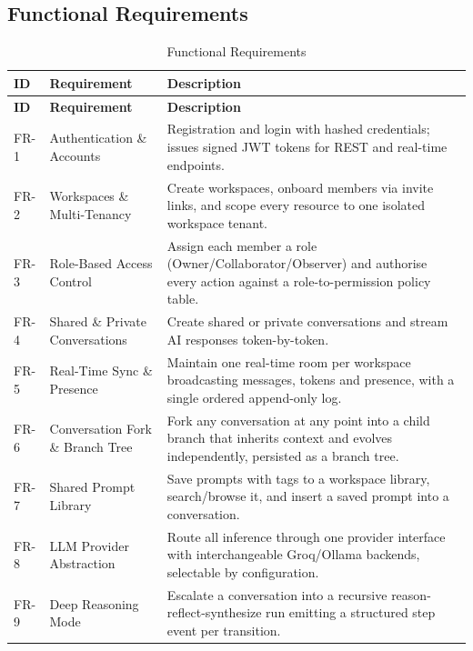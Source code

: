 \documentclass[12pt,a4paper]{report}
\begin{document}
\subsection{Functional Requirements}
\begingroup
\setlength{\parskip}{0pt}\renewcommand{\arraystretch}{1.32}\footnotesize
\begin{xltabular}{\textwidth}{>{\hsize\raggedright\arraybackslash}X >{\hsize\raggedright\arraybackslash}X >{\hsize\raggedright\arraybackslash}X}
\caption{Functional Requirements}\\
\toprule
\textbf{ID} & \textbf{Requirement} & \textbf{Description} \\
\midrule\endfirsthead
\toprule
\textbf{ID} & \textbf{Requirement} & \textbf{Description} \\
\midrule\endhead
\bottomrule\endfoot
FR-1 & Authentication \& Accounts & Registration and login with hashed credentials; issues signed JWT tokens for REST and real-time endpoints. \\
FR-2 & Workspaces \& Multi-Tenancy & Create workspaces, onboard members via invite links, and scope every resource to one isolated workspace tenant. \\
FR-3 & Role-Based Access Control & Assign each member a role (Owner/Collaborator/Observer) and authorise every action against a role-to-permission policy table. \\
FR-4 & Shared \& Private Conversations & Create shared or private conversations and stream AI responses token-by-token. \\
FR-5 & Real-Time Sync \& Presence & Maintain one real-time room per workspace broadcasting messages, tokens and presence, with a single ordered append-only log. \\
FR-6 & Conversation Fork \& Branch Tree & Fork any conversation at any point into a child branch that inherits context and evolves independently, persisted as a branch tree. \\
FR-7 & Shared Prompt Library & Save prompts with tags to a workspace library, search/browse it, and insert a saved prompt into a conversation. \\
FR-8 & LLM Provider Abstraction & Route all inference through one provider interface with interchangeable Groq/Ollama backends, selectable by configuration. \\
FR-9 & Deep Reasoning Mode & Escalate a conversation into a recursive reason-reflect-synthesize run emitting a structured step event per transition. \\

\end{xltabular}
\end{document}
